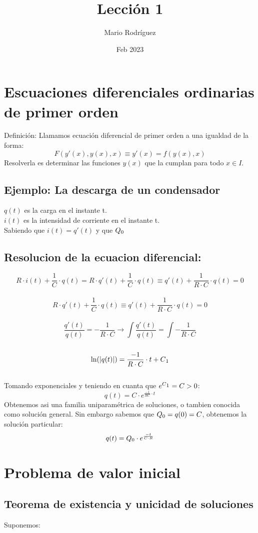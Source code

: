 \documentclass{article}
\title{Lección 1}
\author{Mario Rodríguez}
\date{Feb 2023}
\begin{document}
\maketitle

\section{Escuaciones diferenciales ordinarias de primer orden}
Definición: Llamamos ecuación diferencial de primer orden a una igualdad de la forma:
\[F(y'(x), y(x), x) \equiv y'(x)=f(y(x), x)\]
Resolverla es determinar las funciones $y(x)$ que la cumplan para todo $x\in I$.
\subsection{Ejemplo: La descarga de un condensador}
$q(t)$ es la carga en el instante t.\\
$i(t)$ es la intensidad de corriente en el instante t.\\
Sabiendo que $i(t) = q'(t)$ y que $Q\textsubscript{0}$
\subsection{Resolucion de la ecuacion diferencial:}
\[R\cdot i(t)+\frac{1}{C}\cdot q(t) = R\cdot q'(t)+\frac{1}{C}\cdot q(t) \equiv q'(t)+\frac{1}{R\cdot C}\cdot q(t) = 0 \]
\\
\[R\cdot q'(t)+\frac{1}{C}\cdot q(t) \equiv q'(t)+\frac{1}{R\cdot C}\cdot q(t) = 0 \]
\\
\[\frac{q'(t)}{q(t)}=-\frac{1}{R \cdot C} \rightarrow \int\frac{q'(t)}{q(t)} = \int-\frac{1}{R \cdot C} \]
\\
\[ \ln(|q(t)|)= \frac{-1}{R\cdot C}\cdot t + C\textsubscript{1}\]
\\
Tomando exponenciales y teniendo en cuanta que $e^{C\textsubscript{1}}=C>0$:
\[q(t) = C \cdot e^{\frac{-1}{RC}\cdot t}\]
Obtenemos asi una familia uniparamétrica de soluciones, o tambien conocida como solución general.
Sin embargo sabemos que $Q\textsubscript{0}=q(0)=C$, obtenemos la solución particular:
\[q(t)=Q\textsubscript{0}\cdot e^{\frac{-t}{C\cdot R}}\] 

\section*{Problema de valor inicial}
\subsection{Teorema de existencia y unicidad de soluciones}
Suponemos:
\end{document}

